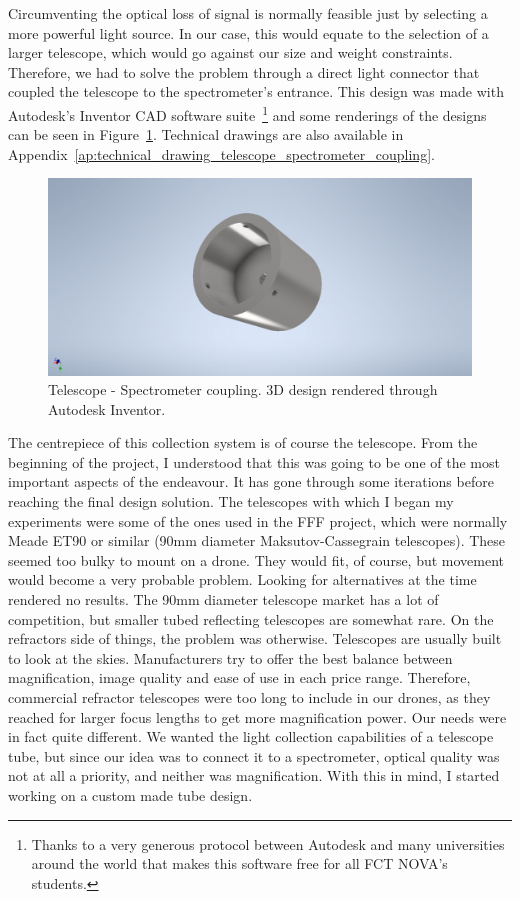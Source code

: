 Circumventing the optical loss of signal is normally feasible just by
selecting a more powerful light source. In our case, this would equate
to the selection of a larger telescope, which would go against our size
and weight constraints. Therefore, we had to solve the problem through a
direct light connector that coupled the telescope to the spectrometer's
entrance. This design was made with Autodesk's Inventor CAD software
suite~\footnote{Thanks to a very generous protocol between Autodesk and
many universities around the world that makes this software free for all
FCT NOVA's students.} and some renderings of the designs can be seen in
Figure~\ref{fig:spectrometer_telescope_coupling_3d}. Technical drawings
are also available in
Appendix~\ref{ap:technical_drawing_telescope_spectrometer_coupling}.

\begin{figure}[htpb]
    \centering
    \includegraphics[width=\textwidth]{img/pdf/eyepieceAdapter.pdf}
    \caption{Telescope - Spectrometer coupling. 3D design rendered
    through Autodesk Inventor.}%
    \label{fig:spectrometer_telescope_coupling_3d}
\end{figure}

The centrepiece of this collection system is of course the telescope.
From the beginning of the project, I understood that this was going to
be one of the most important aspects of the endeavour. It has gone
through some iterations before reaching the final design solution. The
telescopes with which I began my experiments were some of the ones used
in the \gls{FFF} project, which were normally Meade ET90 or similar
(90mm diameter Maksutov-Cassegrain telescopes). These seemed too bulky
to mount on a drone. They would fit, of course, but movement would
become a very probable problem. Looking for alternatives at the time
rendered no results. The 90mm diameter telescope market has a lot of
competition, but smaller tubed reflecting telescopes are somewhat rare.
On the refractors side of things, the problem was otherwise. Telescopes
are usually built to look at the skies. Manufacturers try to offer the
best balance between magnification, image quality and ease of use in
each price range. Therefore, commercial refractor telescopes were too
long to include in our drones, as they reached for larger focus lengths
to get more magnification power. Our needs were in fact quite
different. We wanted the light collection capabilities of a telescope
tube, but since our idea was to connect it to a spectrometer, optical
quality was not at all a priority, and neither was magnification. With
this in mind, I started working on a custom made tube design.

